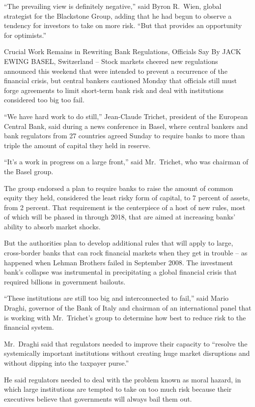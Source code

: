 ﻿\documentclass[12pt]{article}
\begin{document}
``The prevailing view is definitely negative,'' said Byron R.~Wien, global strategist for the
Blackstone Group, adding that he had begun to observe a tendency for investors to take on more risk.
``But that provides an opportunity for optimists.''

Crucial Work Remains in Rewriting Bank Regulations, Officials Say By JACK EWING BASEL, Switzerland
-- Stock markets cheered new regulations announced this weekend that were intended to prevent a
recurrence of the financial crisis, but central bankers cautioned Monday that officials still must
forge agreements to limit short-term bank risk and deal with institutions considered too big too
fail.

``We have hard work to do still,'' Jean-Claude Trichet, president of the European Central Bank, said
during a news conference in Basel, where central bankers and bank regulators from 27 countries
agreed Sunday to require banks to more than triple the amount of capital they held in reserve.

``It's a work in progress on a large front,'' said Mr.~Trichet, who was chairman of the Basel group.

The group endorsed a plan to require banks to raise the amount of common equity they held,
considered the least risky form of capital, to 7 percent of assets, from 2 percent. That requirement
is the centerpiece of a host of new rules, most of which will be phased in through 2018, that are
aimed at increasing banks' ability to absorb market shocks.

But the authorities plan to develop additional rules that will apply to large, cross-border banks
that can rock financial markets when they get in trouble -- as happened when Lehman Brothers failed
in September 2008. The investment bank's collapse was instrumental in precipitating a global
financial crisis that required billions in government bailouts.

``These institutions are still too big and interconnected to fail,'' said Mario Draghi, governor of
the Bank of Italy and chairman of an international panel that is working with Mr.~Trichet's group to
determine how best to reduce risk to the financial system.

Mr.~Draghi said that regulators needed to improve their capacity to ``resolve the systemically
important institutions without creating huge market disruptions and without dipping into the
taxpayer purse.''

He said regulators needed to deal with the problem known as moral hazard, in which large
institutions are tempted to take on too much risk because their executives believe that governments
will always bail them out.
\end{document}
